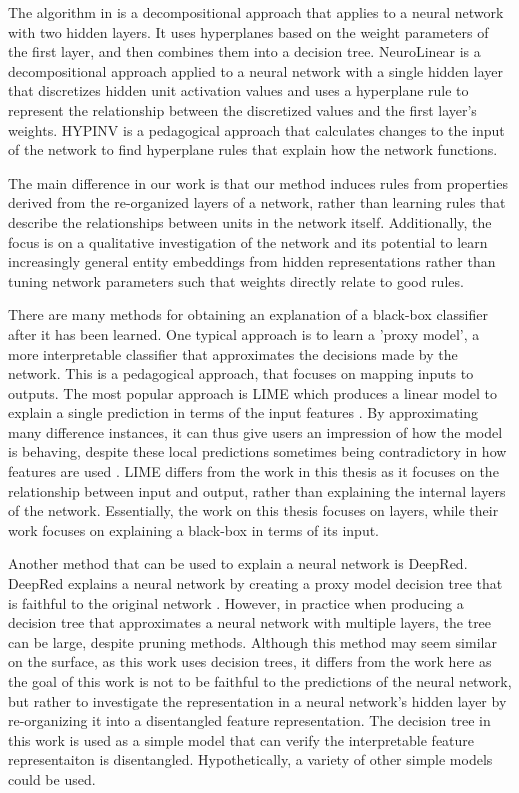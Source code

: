 The algorithm in \cite{Kim2000} is a decompositional approach that applies to a neural network with two hidden layers. It uses hyperplanes based on the weight parameters of the first layer, and then combines them into a decision tree. NeuroLinear \cite{Setiono1997c} is a decompositional approach applied to a neural network with a single hidden layer that discretizes hidden unit activation values and uses a hyperplane rule to represent the relationship between the discretized values and the first layer's weights. HYPINV \cite{Saad2007b} is a pedagogical approach that calculates changes to the input of the network to find hyperplane rules that explain how the network functions. 

The main difference in our work is that our method induces rules from properties derived from the re-organized layers of a network, rather than learning rules that describe the relationships between units in the network itself. Additionally, the focus is on a qualitative investigation of the network and its potential to learn increasingly general entity embeddings from hidden representations rather than tuning network parameters such that weights directly relate to good rules. 

There are many methods for obtaining an explanation of a black-box classifier after it has been learned. One typical approach is to learn a 'proxy model', a more interpretable classifier that approximates the decisions made by the network. This is a pedagogical approach, that focuses on mapping inputs to outputs. The most popular approach is  LIME which produces a linear model to explain a single prediction in terms of the input features  \cite{Ribeiro2016}. By approximating many difference instances, it can thus give users an impression of how the model is behaving, despite these local predictions sometimes being contradictory in how features are used \cite{Ribeiro2016a}.  LIME differs from the work in this thesis as it focuses on the relationship between input and output, rather than explaining the internal layers of the network. Essentially, the work on this thesis focuses on layers, while their work focuses on explaining a black-box in terms of its input. 

Another method that can be used to explain a neural network is DeepRed. DeepRed explains a neural network by creating a proxy model decision tree that is faithful to the original network \cite{Zilke2016}. However, in practice when producing a decision tree that approximates a neural network with multiple layers, the tree can be large, despite pruning methods. Although this method may seem similar on the surface, as this work uses decision trees, it differs from the work here as the goal of this work is not to be faithful to the predictions of the neural network, but rather to investigate the representation in a neural network's hidden layer by re-organizing it into a disentangled feature representation. The decision tree in this work is used as a simple  model that can verify the interpretable feature representaiton is disentangled. Hypothetically, a variety of other simple  models could be used.

